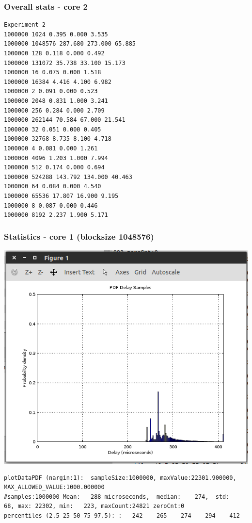 \documentclass{article}
\begin{document}
\subsubsection{Overall stats - core 2}
\begin{lstlisting}
Experiment 2
1000000 1024 0.395 0.000 3.535
1000000 1048576 287.680 273.000 65.885
1000000 128 0.118 0.000 0.492
1000000 131072 35.738 33.100 15.173
1000000 16 0.075 0.000 1.518
1000000 16384 4.416 4.100 6.982
1000000 2 0.091 0.000 0.523
1000000 2048 0.831 1.000 3.241
1000000 256 0.284 0.000 2.709
1000000 262144 70.584 67.000 21.541
1000000 32 0.051 0.000 0.405
1000000 32768 8.735 8.100 4.718
1000000 4 0.081 0.000 1.261
1000000 4096 1.203 1.000 7.994
1000000 512 0.174 0.000 0.694
1000000 524288 143.792 134.000 40.463
1000000 64 0.084 0.000 4.540
1000000 65536 17.807 16.900 9.195
1000000 8 0.087 0.000 0.446
1000000 8192 2.237 1.900 5.171
\end{lstlisting}

\subsubsection{Statistics - core 1 (blocksize 1048576)}

\includegraphics{q3/exp2/core1}

\begin{lstlisting}
plotDataPDF (nargin:1):  sampleSize:1000000, maxValue:22301.900000,  MAX_ALLOWED_VALUE:1000.000000
#samples:1000000 Mean:   288 microseconds,  median:    274,  std:     68, max: 22302, min:   223, maxCount:24821 zeroCnt:0
percentiles (2.5 25 50 75 97.5): :   242    265    274    294    412
\end{lstlisting}
\end{document}
